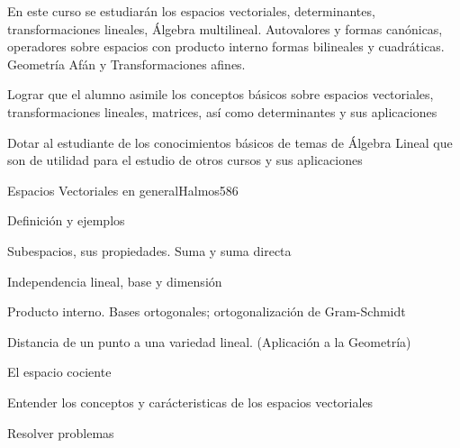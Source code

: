 
\begin{syllabus}


\begin{justification}
En este curso se estudiarán los espacios vectoriales, determinantes, transformaciones lineales, Álgebra multilineal.
Autovalores y formas canónicas, operadores sobre espacios con producto interno formas bilineales y cuadráticas. Geometría Afán y Transformaciones afines.
\end{justification}

\begin{goals}
\item  Lograr que el alumno asimile los conceptos básicos sobre espacios vectoriales, transformaciones lineales, matrices, así­ como determinantes y sus aplicaciones
\item  Dotar al estudiante de los conocimientos básicos de temas de Álgebra Lineal que son de utilidad para el estudio de otros cursos y sus aplicaciones
\end{goals}

\begin{outcomes}
\end{outcomes}

\begin{unit}{Espacios Vectoriales en general}{Halmos58}{6}
   \begin{topics}
         \item  Definición y ejemplos
	 \item  Subespacios, sus propiedades. Suma y suma directa
         \item  Independencia lineal, base y dimensión
	 \item  Producto interno. Bases ortogonales; ortogonalización de Gram-Schmidt
         \item  Distancia de un punto a una variedad lineal. (Aplicación a la Geometría)
         \item  El espacio cociente
   \end{topics}

   \begin{learningoutcomes}
         \item  Entender los conceptos y carácteristicas de los espacios vectoriales
         \item  Resolver problemas
   \end{learningoutcomes}
\end{unit}


\end{syllabus}
